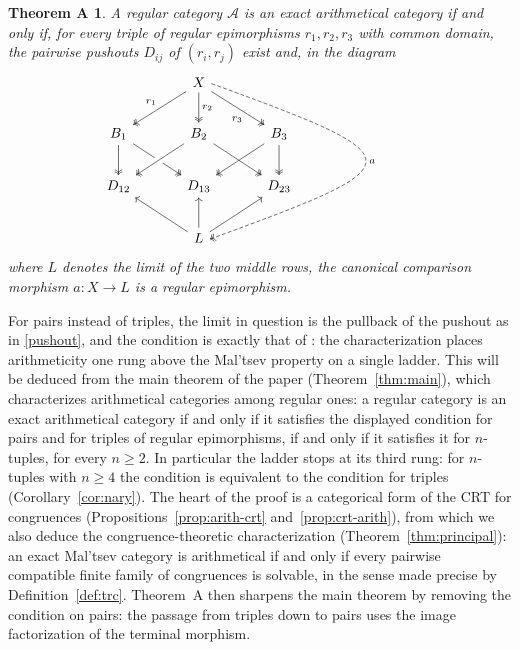 \documentclass[11pt,a4paper]{article}
\theoremstyle{plain}
\theoremstyle{definition}
\theoremstyle{remark}
\theoremstyle{plain}
\newtheorem*{theoremA}{Theorem A}
\begin{document}
\begin{theoremA}
A regular category $\mathcal{A}$ is an exact arithmetical 
category if and only if, for every triple of regular epimorphisms
$r_1, r_2, r_3$ with common domain, the pairwise pushouts $D_{ij}$ of
$(r_i, r_j)$ exist and, in the diagram
\begin{equation}\label{cube}
\begin{tikzcd}[column sep=1.6em, row sep=2.2em]
& & X
\arrow[dll, two heads, "r_1"']
\arrow[d, two heads, "r_2"]
\arrow[drr, two heads, "r_3"'{pos=0.65}]
\arrow[ddd, dashed, two heads, "a",
to path={(\tikztostart.east) .. controls +(5.2,-1.9) and +(5.2,1.9) ..
(\tikztotarget.east)\tikztonodes}] & & \\
B_1
\arrow[d, two heads]
\arrow[drr, two heads] & &
B_2
\arrow[dll, two heads, crossing over]
\arrow[drr, two heads, crossing over] & &
B_3
\arrow[dll, two heads]
\arrow[d, two heads] \\
D_{12} & &
D_{13} & &
D_{23} \\
& & L
\arrow[ull]
\arrow[u]
\arrow[urr] & &
\end{tikzcd}
\end{equation}
where $L$ denotes the limit of the two middle rows, the canonical
comparison morphism $a \colon X \rightarrow L$ is a regular epimorphism.
\end{theoremA}

For pairs instead of triples, the limit in question is the pullback of the
pushout as in \eqref{pushout}, and the condition is exactly that of \cite[Theorem~5.7]{CKP}: the
characterization places arithmeticity one rung above the Mal'tsev property
on a single ladder. This will be deduced from the main theorem of the
paper (Theorem~\ref{thm:main}), which characterizes arithmetical
categories among regular ones: a regular category is an exact arithmetical category if and only if it satisfies the displayed condition for
pairs and for triples of regular epimorphisms, if and only if it satisfies
it for $n$-tuples, for every $n \ge 2$. In particular the ladder stops at
its third rung: for $n$-tuples with $n \ge 4$
the condition is equivalent to the condition for triples
(Corollary~\ref{cor:nary}). The heart of the proof is a categorical form
of the CRT for congruences (Propositions~\ref{prop:arith-crt}
and~\ref{prop:crt-arith}), from which we also deduce the
congruence-theoretic characterization (Theorem~\ref{thm:principal}): an
exact Mal'tsev category is arithmetical
if and only if every pairwise compatible finite family of congruences is
solvable, in the sense made precise by Definition~\ref{def:trc}. Theorem~A
then sharpens the main theorem by removing the condition on pairs: the
passage from triples down to pairs uses the image factorization
of the terminal morphism.
\end{document}
